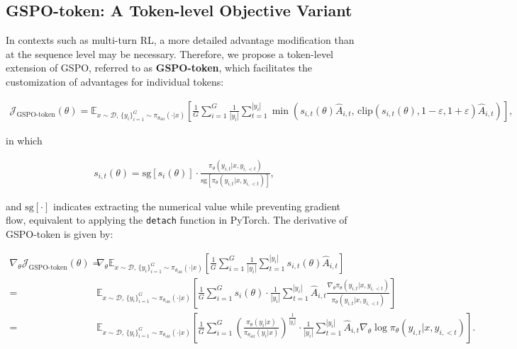\subsection{GSPO-token: A Token-level Objective Variant}

In contexts such as multi-turn RL, a more detailed advantage modification than at the sequence level may be necessary. Therefore, we propose a token-level extension of GSPO, referred to as \textbf{GSPO-token}, which facilitates the customization of advantages for individual tokens:

\begin{align}
\mathcal{J}_\text{GSPO-token}(\theta)
=
\mathbb{E}_{ x \sim \mathcal{D},\, \{y_i\}_{i=1}^G \sim \pi_{\theta_\text{old}}( \cdot | x) }
\left[ 
\frac{1}{G} \sum_{i=1}^{G} \frac{1}{|y_i|} \sum_{t=1}^{|y_i|} 
\min \left( s_{i,t}(\theta) \widehat{A}_{i,t},  \, \mathrm{clip} \left( s_{i,t}(\theta), 1 - {\varepsilon}, 1 + {\varepsilon} \right) \widehat{A}_{i,t} \right) 
\right],
\label{equ:gspo-token}
\end{align}

in which

\begin{align}
s_{i,t}(\theta) 
= \mathrm{sg} \left[ s_{i}(\theta) \right]  \cdot \frac{ \pi_{\theta} (y_{i,t} | x, y_{i,<t}) }{ \mathrm{sg} \left[ \pi_{\theta} (y_{i,t} | x, y_{i,<t}) \right] },
\end{align}

and $\mathrm{sg}[\cdot]$ indicates extracting the numerical value while preventing gradient flow, equivalent to applying the \texttt{detach} function in PyTorch. The derivative of GSPO-token is given by:

\begin{align}
\nabla_{\theta} \mathcal{J}_\text{GSPO-token}(\theta)
=&\ 
\nabla_{\theta} \mathbb{E}_{ x \sim \mathcal{D},\, \{y_i\}_{i=1}^G \sim \pi_{\theta_\text{old}}( \cdot | x) }
\left[ 
\frac{1}{G} \sum_{i=1}^{G}
\frac{1}{|y_i|} \sum_{t=1}^{|y_i|} 
s_{i,t}(\theta) \widehat{A}_{i,t}
\right] \\
=&\ 
\mathbb{E}_{ x \sim \mathcal{D},\, \{y_i\}_{i=1}^G \sim \pi_{\theta_\text{old}}( \cdot | x) }
\left[ 
\frac{1}{G} \sum_{i=1}^{G} s_i (\theta) \cdot \frac{1}{|y_i|} \sum_{t=1}^{|y_i|} 
\widehat{A}_{i,t} \frac{ \nabla_{\theta} \pi_{\theta} (y_{i,t} | x, y_{i,<t}) }{ \pi_{\theta} (y_{i,t} | x, y_{i,<t}) }
\right] \\
=&\ 
\mathbb{E}_{ x \sim \mathcal{D},\, \{y_i\}_{i=1}^G \sim \pi_{\theta_\text{old}}( \cdot | x) }
\left[ 
\frac{1}{G} \sum_{i=1}^{G}  \left( \frac{ \pi_{\theta} (y_i | x) }{ \pi_{\theta_\text{old}} (y_i | x)} \right)^{\frac{1}{|y_i|}}
\cdot \frac{1}{|y_i|} \sum_{t=1}^{|y_i|}
\widehat{A}_{i,t} \nabla_{\theta} \log \pi_{\theta} (y_{i,t} | x, y_{i,<t})  
\right].
\label{equ:gspo-token_grad}
\end{align}

